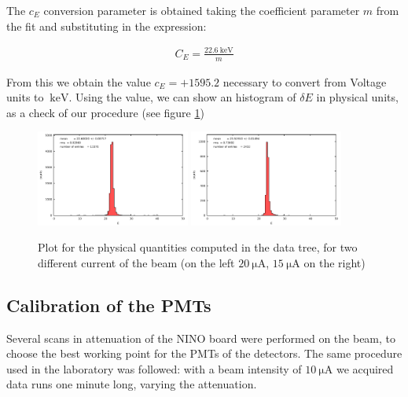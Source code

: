 The $c_{E}$ conversion parameter is obtained taking the coefficient parameter $m$ from the fit and substituting in the expression:

\begin{align*}
C_{E} =  \frac{\SI{22.6}{\kilo \electronvolt}}{m}
\end{align*}

From this we obtain the value $c_{E} = +1595.2$ necessary to convert from Voltage units to $\SI{}{\kilo \electronvolt}$. Using the value, we can show an histogram of $\delta E$ in physical units, as a check of our procedure (see figure \ref{fig:CheckEnmo})

\begin{figure}[!h]
\centering
\includegraphics[width = 0.45\textwidth]{Analysis/ENMOCheck20.pdf}
\includegraphics[width = 0.45\textwidth]{Analysis/ENMOCheck15.pdf} 
\caption{Plot for the physical quantities computed in the data tree, for two different current of the beam (on the left $\SI{20}{\micro \ampere}$, $\SI{15}{\micro \ampere}$ on the right)}
\label{fig:CheckEnmo}
\end{figure}


\subsection{Calibration of the PMTs} \label{PMTsCalib}

Several scans in attenuation of the NINO board were performed on the beam, to choose the best working point for the PMTs of the detectors. The same procedure used in the laboratory was followed: with a beam intensity of $\SI{10}{\micro \ampere}$ we acquired data runs one minute long, varying the attenuation. 

